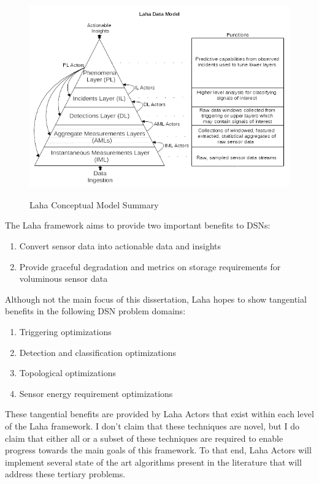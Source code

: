 \begin{figure}
	\caption{Laha Conceptual Model Summary}
	\centering
	\includegraphics{figures/laha_abstract_overview.png}
	\label{laha-abstract-overview}
\end{figure}

The Laha framework aims to provide two important benefits to DSNs:
\begin{enumerate}
	\item Convert sensor data into actionable data and insights
	\item Provide graceful degradation and metrics on storage requirements for voluminous sensor data
\end{enumerate}

Although not the main focus of this dissertation, Laha hopes to show tangential benefits in the following DSN problem domains:

\begin{enumerate}
	\item Triggering optimizations
	\item Detection and classification optimizations
	\item Topological optimizations
	\item Sensor energy requirement optimizations
\end{enumerate}

These tangential benefits are provided by Laha Actors that exist within each level of the Laha framework. I don't claim that these techniques are novel, but I do claim that either all or a subset of these techniques are required to enable progress towards the main goals of this framework. To that end, Laha Actors will implement several state of the art algorithms present in the literature that will address these tertiary problems.

